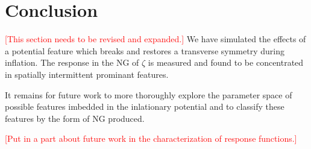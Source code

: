 
\section{Conclusion} \label{sec:conclusion}
\textcolor{red}{[This section needs to be revised and expanded.]}
We have simulated the effects of a potential feature which breaks and restores a transverse symmetry during inflation. 
The response in the NG of $\zeta$ is measured and found to be concentrated in spatially intermittent prominant features.

It remains for future work to more thoroughly explore the parameter space of possible features imbedded in the inlationary potential and to classify these features by the form of NG produced.

\textcolor{red}{[Put in a part about future work in the characterization of response functions.]}
